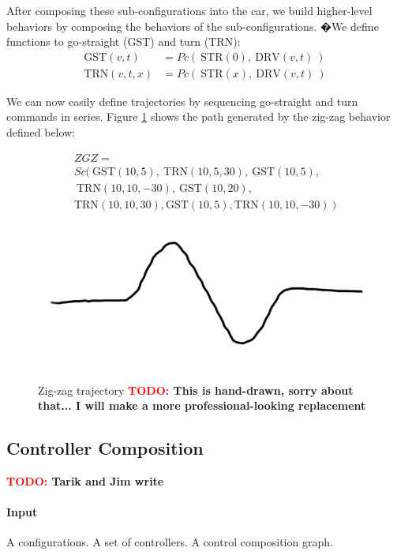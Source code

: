 \documentclass[conference]{IEEEtran}
\theoremstyle{definition}
\newcommand{\TODO}[1]{ {\bf \textcolor{red}{TODO:} #1 }}
\begin{document}
After composing these sub-configurations into the car, we build higher-level
behaviors by composing the behaviors of the sub-configurations. �We define functions
to go-straight (GST) and turn (TRN):
\begin{align*}
\mathrm{GST}(v,t) &= Pc (~\mathrm{STR}(0),~ \mathrm{DRV}(v,t)~)\\
\mathrm{TRN}(v,t,x) &= Pc (~\mathrm{STR}(x),~\mathrm{DRV}(v,t)~)
\end{align*}

We can now easily define trajectories by sequencing go-straight and turn commands
in series. Figure \ref{fig:zigzag} shows the path generated by the zig-zag behavior defined
below:

\begin{align*}
ZGZ = ~~~~~~~~~~~~~~~~~~~~~~~~~~~~~~~~~~~~~~~~~~~~~~~~~~~~~~~~~\\
Sc(~\mathrm{GST}(10,5),~\mathrm{TRN}(10,5,30),~\mathrm{GST}(10,5),\\
~\mathrm{TRN}(10,10,-30),~\mathrm{GST}(10,20), \\
\mathrm{TRN}(10,10,30), \mathrm{GST}(10,5), \mathrm{TRN}(10,10, -30 )~)
\end{align*}

\begin{figure}
\begin{center}
\includegraphics[width=0.7\columnwidth]{images/zigzag.png}
\end{center}
\caption{Zig-zag trajectory \TODO{This is hand-drawn, sorry about that... I will
make a more professional-looking replacement}}
\label{fig:zigzag}
\end{figure}
 
\subsection{Controller Composition}
\TODO{Tarik and Jim write}
\paragraph{Input}
A configurations. A set of controllers. A control composition graph.
\end{document}
